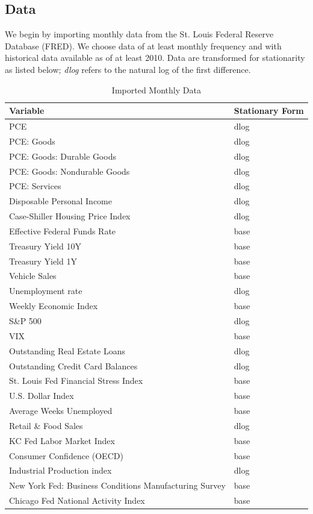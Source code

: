 \documentclass[11pt, letterpaper]{article}\usepackage[]{graphicx}\usepackage[]{color}
\begin{document}
\subsection{Data}
We begin by importing monthly data from the St. Louis Federal Reserve Database (FRED). We choose data of at least monthly frequency and with historical data available as of at least 2010. Data are transformed for stationarity as listed below; \textit{dlog} refers to the natural log of the first difference.

\begin{table}[!h]
\centering
\begingroup\scriptsize
\begin{tabular}{ll}
  \hline
Variable & Stationary Form \\ 
  \hline
PCE & dlog \\ 
  PCE: Goods & dlog \\ 
  PCE: Goods: Durable Goods & dlog \\ 
  PCE: Goods: Nondurable Goods & dlog \\ 
  PCE: Services & dlog \\ 
  Disposable Personal Income & dlog \\ 
  Case-Shiller Housing Price Index & dlog \\ 
  Effective Federal Funds Rate & base \\ 
  Treasury Yield 10Y & base \\ 
  Treasury Yield 1Y & base \\ 
  Vehicle Sales & base \\ 
  Unemployment rate & dlog \\ 
  Weekly Economic Index & base \\ 
  S\&P 500 & dlog \\ 
  VIX & base \\ 
  Outstanding Real Estate Loans & dlog \\ 
  Outstanding Credit Card Balances & dlog \\ 
  St. Louis Fed Financial Stress Index & base \\ 
  U.S. Dollar Index & base \\ 
  Average Weeks Unemployed & base \\ 
  Retail \& Food Sales & dlog \\ 
  KC Fed Labor Market Index & base \\ 
  Consumer Confidence (OECD) & base \\ 
  Industrial Production index & dlog \\ 
  New York Fed: Business Conditions Manufacturing Survey & base \\ 
  Chicago Fed National Activity Index & base \\ 
   \hline
\end{tabular}
\endgroup
\caption{Imported Monthly Data} 
\end{table}
\end{document}
